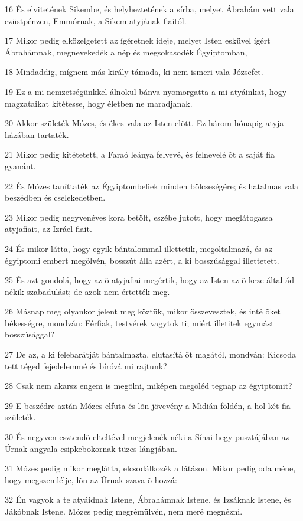 \par 16 És elvitetének Sikembe, és helyheztetének a sírba, melyet Ábrahám vett vala ezüstpénzen, Emmórnak, a Sikem atyjának fiaitól.
\par 17 Mikor pedig elközelgetett az ígéretnek ideje, melyet Isten esküvel ígért Ábrahámnak, megnevekedék a nép és  megsokasodék Égyiptomban,
\par 18 Mindaddig, mígnem más király támada, ki nem ismeri vala Józsefet.
\par 19 Ez a mi nemzetségünkkel álnokul bánva nyomorgatta a mi atyáinkat, hogy magzataikat kitétesse, hogy életben ne maradjanak.
\par 20 Akkor születék Mózes, és ékes vala az Isten elõtt. Ez három hónapig atyja házában tartaték.
\par 21 Mikor pedig kitétetett, a Faraó leánya felvevé, és felnevelé õt a saját fia gyanánt.
\par 22 És Mózes taníttaték az Égyiptombeliek minden bölcseségére; és hatalmas vala beszédben és cselekedetben.
\par 23 Mikor pedig negyvenéves kora betölt, eszébe jutott, hogy meglátogassa atyjafiait, az Izráel fiait.
\par 24 És mikor látta, hogy egyik bántalommal illettetik, megoltalmazá, és az égyiptomi embert megölvén, bosszút álla azért, a ki bosszúsággal illettetett.
\par 25 És azt gondolá, hogy az õ atyjafiai megértik, hogy az Isten az õ keze által ád nékik szabadulást; de azok nem értették meg.
\par 26 Másnap meg olyankor jelent meg köztük, mikor összevesztek, és inté õket békességre, mondván: Férfiak, testvérek vagytok ti; miért illetitek egymást bosszúsággal?
\par 27 De az, a ki felebarátját bántalmazta, elutasítá õt magától, mondván: Kicsoda tett téged fejedelemmé és bíróvá mi rajtunk?
\par 28 Csak nem akarsz engem is megölni, miképen megöléd tegnap az égyiptomit?
\par 29 E beszédre aztán Mózes elfuta és lõn jövevény a Midián földén, a hol két fia születék.
\par 30 És negyven esztendõ elteltével megjelenék néki a Sínai hegy pusztájában az Úrnak angyala csipkebokornak tüzes lángjában.
\par 31 Mózes pedig mikor meglátta, elcsodálkozék a látáson. Mikor pedig oda méne, hogy megszemlélje, lõn az Úrnak szava õ hozzá:
\par 32 Én vagyok a te atyáidnak Istene, Ábrahámnak Istene, és Izsáknak Istene, és Jákóbnak Istene. Mózes pedig megrémülvén, nem meré megnézni.
